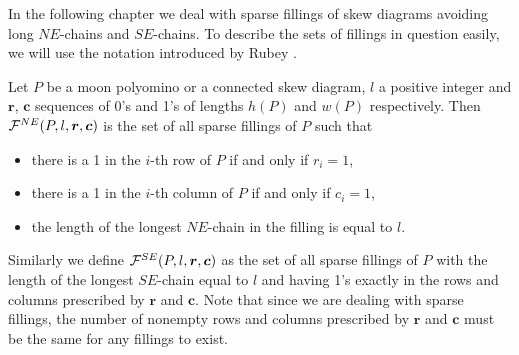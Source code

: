 In the following chapter we deal with sparse fillings of skew diagrams avoiding long $NE$-chains and $SE$-chains. To describe
the sets of fillings in question easily, we will use the notation introduced by Rubey \cite{Rubey11}.

\begin{defn}\label{def_rubey}
Let $P$ be a moon polyomino or a connected skew diagram, 
$l$ a positive integer and $\bm{r}$, $\bm{c}$ sequences of 0's and 1's of lengths $h(P)$ and $w(P)$ respectively.
Then $\mathcal{F}^{NE}(P, l, \bm{r}, \bm{c})$ is the set of all sparse fillings of $P$ such that
\begin{itemize}
\item there is a 1 in the $i$-th row of $P$ if and only if $r_i = 1$,
\item there is a 1 in the $i$-th column of $P$ if and only if $c_i = 1$,
\item the length of the longest $NE$-chain in the filling is equal to $l$.
\end{itemize}
\end{defn}

Similarly we define $\mathcal{F}^{SE}(P, l, \bm{r}, \bm{c})$ as the set of all sparse fillings of $P$ with the length of the longest $SE$-chain
equal to $l$ and having 1's exactly in the rows and columns prescribed by $\bm{r}$ and $\bm{c}$. Note that since we are dealing with sparse fillings,
the number of nonempty rows and columns prescribed by $\bm{r}$ and $\bm{c}$ must be the same for any fillings to exist.


